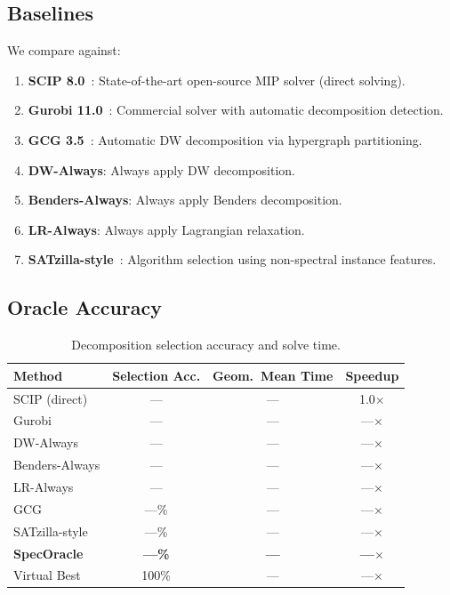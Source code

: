 \documentclass[11pt]{article}
\begin{document}
\subsection{Baselines}

We compare against:
\begin{enumerate}
\item \textbf{SCIP 8.0}~\cite{scip}: State-of-the-art open-source MIP solver (direct solving).
\item \textbf{Gurobi 11.0}~\cite{gurobi}: Commercial solver with automatic decomposition detection.
\item \textbf{GCG 3.5}~\cite{gcg}: Automatic DW decomposition via hypergraph partitioning.
\item \textbf{DW-Always}: Always apply DW decomposition.
\item \textbf{Benders-Always}: Always apply Benders decomposition.
\item \textbf{LR-Always}: Always apply Lagrangian relaxation.
\item \textbf{SATzilla-style}~\cite{xu2008}: Algorithm selection using non-spectral instance features.
\end{enumerate}

\subsection{Oracle Accuracy}

\begin{table}[t]
\centering
\caption{Decomposition selection accuracy and solve time.}
\begin{tabular}{lccc}
\toprule
\textbf{Method} & \textbf{Selection Acc.} & \textbf{Geom.\ Mean Time} & \textbf{Speedup} \\
\midrule
SCIP (direct) & --- & --- & 1.0$\times$ \\
Gurobi & --- & --- & ---$\times$ \\
DW-Always & --- & --- & ---$\times$ \\
Benders-Always & --- & --- & ---$\times$ \\
LR-Always & --- & --- & ---$\times$ \\
GCG & ---\% & --- & ---$\times$ \\
SATzilla-style & ---\% & --- & ---$\times$ \\
\midrule
\textbf{SpecOracle} & \textbf{---\%} & \textbf{---} & \textbf{---$\times$} \\
Virtual Best & 100\% & --- & ---$\times$ \\
\bottomrule
\end{tabular}
\end{table}
\end{document}

